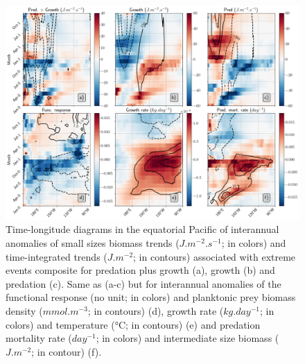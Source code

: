 \begin{figure}[h!tp]
	\centering
	\includegraphics[scale=0.4]{figs/fig8.png}	
	\caption{Time-longitude diagrams in the equatorial Pacific of interannual anomalies of small sizes biomass trends ($J.m^{-2}.s^{-1}$; in colors) and time-integrated trends ($J.m^{-2}$; in contours) associated with extreme \nino{} events composite for predation plus growth (a), growth (b) and predation (c). Same as (a-c) but for interannual anomalies of the functional response (no unit; in colors) and planktonic prey biomass density ($mmol.m^{-3}$; in contours) (d), growth rate ($kg.day^{-1}$; in colors) and temperature (°C; in contours) (e) and predation mortality rate ($day^{-1}$; in colors) and intermediate size biomass ($J.m^{-2}$; in contour) (f).}
	\label{fig:fig8}
\end{figure}

